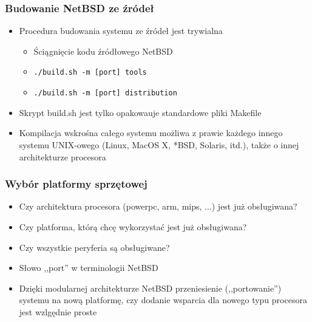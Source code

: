 \documentclass[dvipsnames,table]{beamer}
\begin{document}
\begin{frame}
\frametitle{Budowanie NetBSD ze źródeł}
\begin{itemize}
	\item Procedura budowania systemu ze źródeł jest trywialna
	\begin{itemize}
		\item Ściągnięcie kodu źródłowego NetBSD
		\item \tt{./build.sh -m [port] tools}
		\item \tt{./build.sh -m [port] distribution}
	\end{itemize}
	\item Skrypt build.sh jest tylko opakowauje standardowe pliki Makefile
	\item Kompilacja wskrośna całego systemu możliwa z prawie każdego innego systemu UNIX-owego (Linux, MacOS X, *BSD, Solaris, itd.), także o innej architekturze procesora
\end{itemize}
\end{frame}


\begin{frame}
\frametitle{Wybór platformy sprzętowej}
\begin{itemize}
	\item Czy architektura procesora (powerpc, arm, mips, ...) jest już obsługiwana? 
	\item Czy platforma, którą chcę wykorzystać jest już obsługiwana?
	\item Czy wszystkie peryferia są obsługiwane?
	\item Słowo ,,port'' w terminologii NetBSD
	\item Dzięki modularnej architekturze NetBSD przeniesienie (,,portowanie'') systemu na nową platformę, czy dodanie wsparcia dla nowego typu procesora jest wzlgędnie proste
\end{itemize}
\end{frame}
\end{document}
